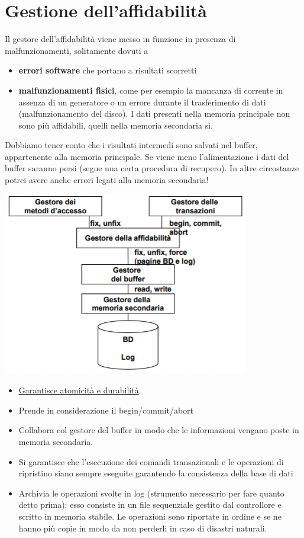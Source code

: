 \section{Gestione dell'affidabilità}
Il gestore dell'affidabilità viene messo in funzione in presenza di malfunzionamenti, solitamente dovuti a
\begin{itemize}
	\item \textbf{errori software} che portano a risultati scorretti
	\item \textbf{malfunzionamenti fisici}, come per esempio la mancanza di corrente in assenza di un generatore o un errore durante il trasferimento di dati (malfunzionamento del disco). I dati presenti nella memoria principale non sono più affidabili, quelli nella memoria secondaria sì.
\end{itemize}
Dobbiamo tener conto che i risultati intermedi sono salvati nel buffer, appartenente alla memoria principale. Se viene meno l'alimentazione i dati del buffer saranno persi (segue una certa procedura di recupero). In altre circostanze potrei avere anche errori legati alla memoria secondaria!
\begin{center}
	\includegraphics{images/134.PNG}
\end{center}
\begin{itemize}
	\item \underline{Garantisce atomicità e durabilità}.
	\item Prende in considerazione il begin/commit/abort
	\item Collabora col gestore del buffer in modo che le informazioni vengano poste in memoria secondaria.
	\item Si garantisce che l'esecuzione dei comandi transazionali e le operazioni di ripristino siano sempre eseguite garantendo la consistenza della base di dati
	\item Archivia le operazioni svolte in log (strumento necessario per fare quanto detto prima): esso consiste in un file sequenziale gestito dal controllore e scritto in memoria stabile. Le operazioni sono riportate in ordine e se ne hanno più copie in modo da non perderli in caso di disastri naturali.
\end{itemize}
